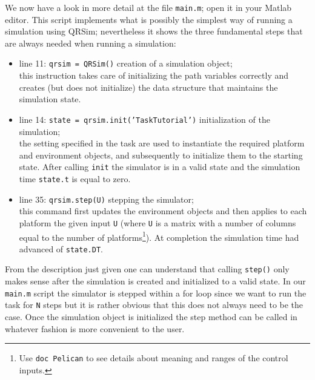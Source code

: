 \documentclass[a4paper,11pt]{article}
\begin{document}
We now have a look in more detail at the file \texttt{main.m}; open it in your Matlab editor. 
This script implements what is possibly the simplest way of running a simulation using QRSim; nevertheless it shows the three fundamental steps that are always needed when running a simulation:
\begin{itemize}
 \item line 11: \texttt{qrsim = QRSim()}  creation of a simulation object; \\
  this instruction takes care of initializing the path variables correctly and creates (but does not initialize) the data structure that maintains the simulation state. 
 \item line 14: \texttt{state = qrsim.init('TaskTutorial')} initialization of the simulation;\\
  the setting specified in the task are used to instantiate the required platform and environment objects, and subsequently to initialize them to the starting state. After calling \texttt{init} the simulator is in a valid state and the simulation time \texttt{state.t} is equal to zero.
 \item line 35: \texttt{qrsim.step(U)} stepping the simulator;\\
  this command first updates the environment objects and then applies to each platform the given input \texttt{U} (where \texttt{U} is a matrix with a number of columns equal to the number of platforms\footnote{Use \texttt{doc Pelican} to see details about meaning and ranges of the control inputs.}). At completion the simulation time had advanced of \texttt{state.DT}.  
\end{itemize}
From the description just given one can understand that calling \texttt{step()} only makes sense after the simulation is created and initialized to a valid state. 
In our \texttt{main.m} script the simulator is stepped within a for loop since we want to run the task for \texttt{N} steps but it is rather obvious that this does not always need to be the case. Once the simulation object is initialized the step method can be called in whatever fashion is more convenient to the user.
\end{document}
